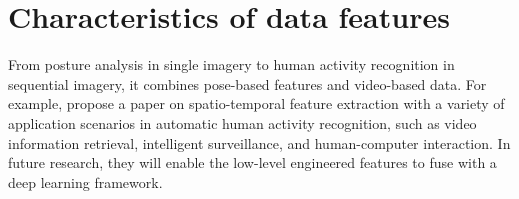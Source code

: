 \section{Characteristics of data features}
\label{sec:Characteristics of data features}
\citet{thrasher2011mood}

From posture analysis in single imagery to human activity recognition in sequential imagery, it combines pose-based features and video-based data.
For example, \citet{yao2016spatio} propose a paper on spatio-temporal feature extraction with a variety of application scenarios in automatic human activity recognition, such as video information retrieval, intelligent surveillance, and human-computer interaction.
In future research, they will enable the low-level engineered features to fuse with a deep learning framework.

\citet{schuldt2004recognizing}

\citet{gorelick2007actions}

\citet{marszalek2009actions}

\citet{Soomro2014}
